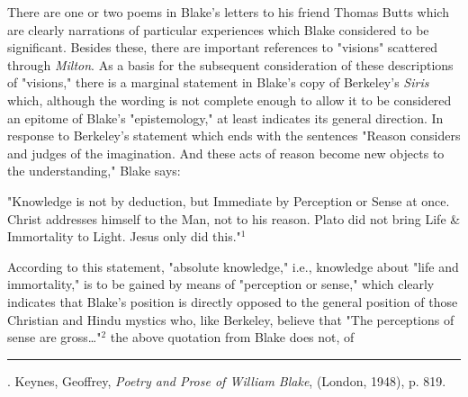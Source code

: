 There are one or two poems in Blake's letters to his friend Thomas Butts which are clearly narrations of particular
experiences which Blake considered to be significant. Besides these, there are important references to "visions" scattered
through \textit{Milton}. As a basis for the subsequent consideration of these descriptions of "visions," there is
a marginal statement in Blake's copy of Berkeley's \textit{Siris} which, although the wording
is not complete enough to allow it to be considered an epitome of Blake's "epistemology," at least
indicates its general direction. In response to Berkeley's statement which ends with the sentences
"Reason considers and judges of the imagination. And these acts of reason become new objects to the understanding," Blake says:\par
\vspace*{0.5\baselineskip}
\begin{center}
	\parbox{0.8\textwidth}{
		\hspace*{5mm}"Knowledge is not by deduction, but Immediate by Perception
		or Sense at once. Christ addresses himself to the Man, not to his reason. Plato did not bring Life
		\& Immortality to Light. Jesus only did this."$^{1}$\par
	}%
\end{center}
\hspace*{5mm}According to this statement, "absolute knowledge," i.e., knowledge about
"life and immortality," is to be gained by means of "perception or sense," which clearly
indicates that Blake's position is directly opposed to the general position of those
Christian and Hindu mystics who, like Berkeley, believe that "The perceptions of sense are gross\dots"$^{2}$ the
above quotation from Blake does not, of\linebreak
\null\par
\vspace*{-\baselineskip}
\vspace*{\fill}
\noindent\rule{0.25\textwidth}{0.4pt}\par
[1, 2]. Keynes, Geoffrey, \textit{Poetry and Prose of William Blake}, (London, 1948), p. 819.\par

\newpage

